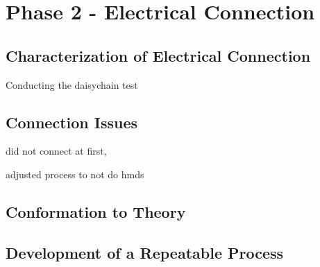 \section{Phase 2 - Electrical Connection}

\subsection{Characterization of Electrical Connection}
Conducting the daisychain test

\subsection{Connection Issues}
did not connect at first,

adjusted process to not do hmds

\subsection{Conformation to Theory}
\subsection{Development of a Repeatable Process}

